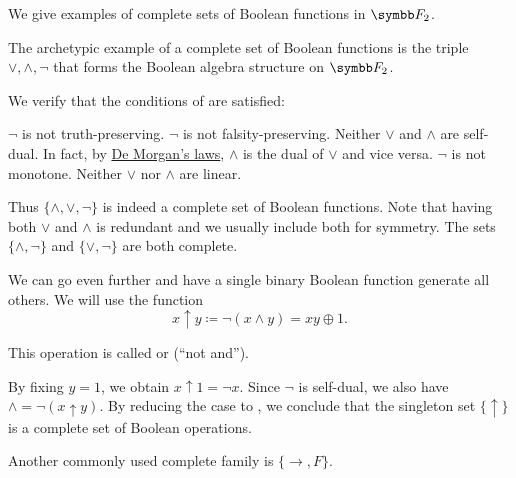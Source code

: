 \begin{example}\label{ex:posts_completeness_theorem}
  We give examples of complete sets of Boolean functions in \( \BF_2 \).

  \begin{ExEnum}
     The archetypic example of a complete set of Boolean functions is the triple \( \vee, \wedge, \neg \) that forms the Boolean algebra structure on \( \BF_2 \).

    We verify that the conditions of  are satisfied:
    \begin{RefList}
       \( \neg \) is not truth-preserving.
       \( \neg \) is not falsity-preserving.
       Neither \( \vee \) and \( \wedge \) are self-dual. In fact, by \hyperref[thm:de_morgans_laws]{De Morgan's laws}, \( \wedge \) is the dual of \( \vee \) and vice versa.
       \( \neg \) is not monotone.
       Neither \( \vee \) nor \( \wedge \) are linear.
    \end{RefList}

    Thus \( \{ \wedge, \vee, \neg \} \) is indeed a complete set of Boolean functions. Note that having both \( \vee \) and \( \wedge \) is redundant and we usually include both for symmetry. The sets \( \{ \wedge, \neg \} \) and \( \{ \vee, \neg \} \) are both complete.

     We can go even further and have a single binary Boolean function generate all others. We will use the function
    \begin{equation}\label{eq:ex:posts_completeness_theorem/nand}
      x \uparrow y \coloneqq \neg(x \wedge y) = xy \oplus 1.
    \end{equation}

    This operation is called  or  (\enquote{not and}).

    By fixing \( y = 1 \), we obtain \( x \uparrow 1 = \neg x \). Since \( \neg \) is self-dual, we also have \( \wedge = \neg(x \uparrow y) \). By reducing the case to , we conclude that the singleton set \( \{ \uparrow \} \) is a complete set of Boolean operations.

     Another commonly used complete family is \( \{ \rightarrow, F \} \).


\end{ExEnum}
\end{example}
